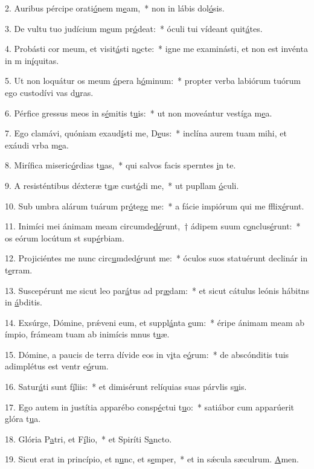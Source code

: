 2. Auribus pércipe orati\uline{ó}nem m\uline{e}am,~* non in lábis dol\uline{ó}sis.\par 
3. De vultu tuo judícium m\uline{e}um pr\uline{ó}deat:~* óculi tui vídeant quit\uline{á}tes.\par 
4. Probásti cor meum, et visit\uline{á}sti n\uline{o}cte:~* igne me examinásti, et non est invénta in m in\uline{í}quitas.\par 
5. Ut non loquátur os meum \uline{ó}pera h\uline{ó}minum:~* propter verba labiórum tuórum ego custodívi vas d\uline{u}ras.\par 
6. Pérfice gressus meos in s\uline{é}mitis t\uline{u}is:~* ut non moveántur vestíga m\uline{e}a.\par 
7. Ego clamávi, quóniam exaud\uline{í}sti me, D\uline{e}us:~* inclína aurem tuam mihi, et exáudi vrba m\uline{e}a.\par 
8. Mirífica miseric\uline{ó}rdias t\uline{u}as,~* qui salvos facis sperntes \uline{i}n te.\par 
9. A resisténtibus déxteræ t\uline{u}æ cust\uline{ó}di me,~* ut pupllam \uline{ó}culi.\par 
10. Sub umbra alárum tuárum pr\uline{ó}teg\uline{e} me:~* a fácie impiórum qui me fflix\uline{é}runt.\par 
11. Inimíci mei ánimam meam circumde\uline{dé}runt,~† ádipem suum c\uline{o}nclus\uline{é}runt:~* os eórum locútum st sup\uline{é}rbiam.\par 
12. Projiciéntes me nunc circ\uline{u}mded\uline{é}runt me:~* óculos suos statuérunt declinár in t\uline{e}rram.\par 
13. Suscepérunt me sicut leo par\uline{á}tus ad pr\uline{æ}dam:~* et sicut cátulus leónis hábitns in \uline{á}bditis.\par 
14. Exsúrge, Dómine, prǽveni eum, et suppl\uline{á}nta \uline{e}um:~* éripe ánimam meam ab ímpio, frámeam tuam ab inimícis mnus t\uline{u}æ.\par 
15. Dómine, a paucis de terra dívide eos in v\uline{i}ta e\uline{ó}rum:~* de abscónditis tuis adimplétus est ventr e\uline{ó}rum.\par 
16. Satur\uline{á}ti sunt f\uline{í}liis:~* et dimisérunt relíquias suas párvlis s\uline{u}is.\par 
17. Ego autem in justítia apparébo consp\uline{é}ctui t\uline{u}o:~* satiábor cum apparúerit glóra t\uline{u}a.\par 
18. Glória P\uline{a}tri, et F\uline{í}lio,~* et Spiríti S\uline{a}ncto.\par 
19. Sicut erat in princípio, et n\uline{u}nc, et s\uline{e}mper,~* et in sǽcula sæculrum. \uline{A}men.\par 
